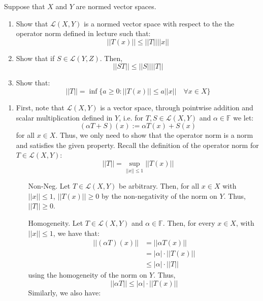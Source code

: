 \documentclass[12pt]{article}
\begin{document}


\begin{problem}{30}
    Suppose that $X$ and $Y$ are normed vector spaces. 
    \begin{enumerate}
        \item Show that $\mathcal{L}(X, Y)$ is a normed vector space with respect to the the operator norm defined in lecture such that: 
        \[ ||T(x)|| \leq ||T|| ||x|| \]
        \item Show that if $S \in \mathcal{L}(Y, Z)$. Then, 
        \[  ||ST|| \leq ||S||||T|| \]
        \item Show that: 
        \[ ||T|| = \inf\{ a \geq 0 : ||T(x)|| \leq a||x|| \quad \forall x \in X\}\]
    \end{enumerate}
\end{problem}
\begin{solution} 
    \bbni 
    \begin{enumerate}
        \item First, note that $\mathcal{L}(X, Y)$ is a vector space, through pointwise addition and scalar multiplication defined in $Y$, i.e. for $T, S \in \mathcal{L}(X, Y)$ and $\alpha \in \mathbb{F}$ we let:
        \[(\alpha T + S)(x) := \alpha T(x) + S(x)\]
        for all $x \in X$. Thus, we only need to show that the operator norm is a norm and satisfies the given property. Recall the definition of the operator norm for $T \in \mathcal{L}(X, Y)$:
        \[ ||T|| = \sup_{||x|| \leq 1} ||T(x)||\] 
        \begin{enumerate}
            \item[Non-Neg.] Let $T \in \mathcal{L}(X, Y)$ be arbitrary. Then, for all $x \in X$ with $||x|| \leq 1$, $||T(x)|| \geq 0$ by the non-negativity of the norm on $Y$. Thus, $||T|| \geq 0$. 
            \item[Homogeneity.] Let $T \in \mathcal{L}(X, Y)$ and $\alpha \in \mathbb{F}$. Then, for every $x \in X$, with $||x|| \leq 1$, we have that: 
            \begin{align*}
                ||(\alpha T)(x)|| &= ||\alpha T(x)|| \\
                &= |\alpha|\cdot ||T(x)|| \\
                &\leq |\alpha| \cdot ||T||
            \end{align*} 
            using the homogeneity of the norm on $Y$. Thus, 
            \[ ||\alpha T|| \leq |\alpha| \cdot ||T(x)||\]
            Similarly, we also have: 
            \begin{align*}

\end{align*}
\end{enumerate}
\end{enumerate}
\end{solution}
\end{document}
